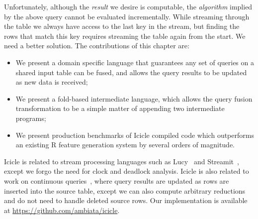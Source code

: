 Unfortunately, although the \emph{result} we desire is computable, the \emph{algorithm} implied by the above query cannot be evaluated incrementally. While streaming through the table we always have access to the last key in the stream, but finding the rows that match this key requires streaming the table again from the start. We need a better solution. The contributions of this chapter are:
\begin{itemize}
\item
We present a domain specific language that guarantees any set of queries on a shared input table can be fused, and allows the query results to be updated as new data is received;

\item
We present a fold-based intermediate language, which allows the query fusion transformation to be a simple matter of appending two intermediate programs;

\item
We present production benchmarks of Icicle compiled code which outperforms an existing R feature generation system by several orders of magnitude. 
\end{itemize}


Icicle is related to stream processing languages such as Lucy~\cite{mandel2010lucy} and Streamit~\cite{thies2002streamit}, except we forgo the need for clock and deadlock analysis. Icicle is also related to work on continuous queries~\cite{arasu2003cql}, where query results are updated as rows are inserted into the source table, except we can also compute arbitrary reductions and do not need to handle deleted source rows. Our implementation is available at \url{https://github.com/ambiata/icicle}.
